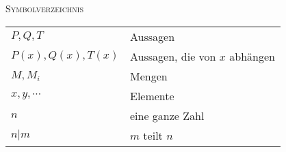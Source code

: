 \documentclass[a4paper]{amsart}
\theoremstyle{definition}
\begin{document}
\begin{large}
    \centerline{\textsc{Symbolverzeichnis}}
\end{large}
\bigskip

\renewcommand*{\arraystretch}{1}

\begin{tabular}{ll}
    $P, Q, T$               & Aussagen\\
    $P(x), Q(x), T(x)$      & Aussagen, die von $x$ abhängen\\
    $M, M_i$                & Mengen\\
    $x, y, \cdots$          & Elemente\\
    $n$                     & eine ganze Zahl\\
    $n|m$                   & $m$ teilt $n$
\end{tabular}
\end{document}
